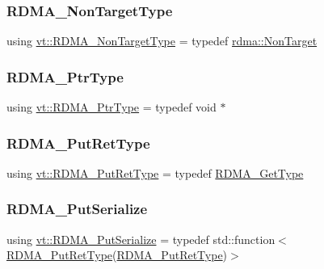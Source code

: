 \mbox{\label{namespacevt_ae5bd2866e5ee83f4d6a53e8730cd3202}} 
\subsubsection{\texorpdfstring{R\+D\+M\+A\+\_\+\+Non\+Target\+Type}{RDMA\_NonTargetType}}
{\footnotesize\ttfamily using \hyperlink{namespacevt_ae5bd2866e5ee83f4d6a53e8730cd3202}{vt\+::\+R\+D\+M\+A\+\_\+\+Non\+Target\+Type} = typedef \hyperlink{structvt_1_1rdma_1_1_non_target}{rdma\+::\+Non\+Target}}

\mbox{\label{namespacevt_a9e2c953286c7616f7c218e9951790776}} 
\subsubsection{\texorpdfstring{R\+D\+M\+A\+\_\+\+Ptr\+Type}{RDMA\_PtrType}}
{\footnotesize\ttfamily using \hyperlink{namespacevt_a9e2c953286c7616f7c218e9951790776}{vt\+::\+R\+D\+M\+A\+\_\+\+Ptr\+Type} = typedef void $\ast$}

\mbox{\label{namespacevt_a50fcc3338d68f7b147b99c0a82ec3a10}} 
\subsubsection{\texorpdfstring{R\+D\+M\+A\+\_\+\+Put\+Ret\+Type}{RDMA\_PutRetType}}
{\footnotesize\ttfamily using \hyperlink{namespacevt_a50fcc3338d68f7b147b99c0a82ec3a10}{vt\+::\+R\+D\+M\+A\+\_\+\+Put\+Ret\+Type} = typedef \hyperlink{namespacevt_a1cab7f4860f65a49ad2c042d6240f288}{R\+D\+M\+A\+\_\+\+Get\+Type}}

\mbox{\label{namespacevt_abeb0129c92a5721f6f2c01b621f149fe}} 
\subsubsection{\texorpdfstring{R\+D\+M\+A\+\_\+\+Put\+Serialize}{RDMA\_PutSerialize}}
{\footnotesize\ttfamily using \hyperlink{namespacevt_abeb0129c92a5721f6f2c01b621f149fe}{vt\+::\+R\+D\+M\+A\+\_\+\+Put\+Serialize} = typedef std\+::function$<$\hyperlink{namespacevt_a50fcc3338d68f7b147b99c0a82ec3a10}{R\+D\+M\+A\+\_\+\+Put\+Ret\+Type}(\hyperlink{namespacevt_a50fcc3338d68f7b147b99c0a82ec3a10}{R\+D\+M\+A\+\_\+\+Put\+Ret\+Type})$>$}

